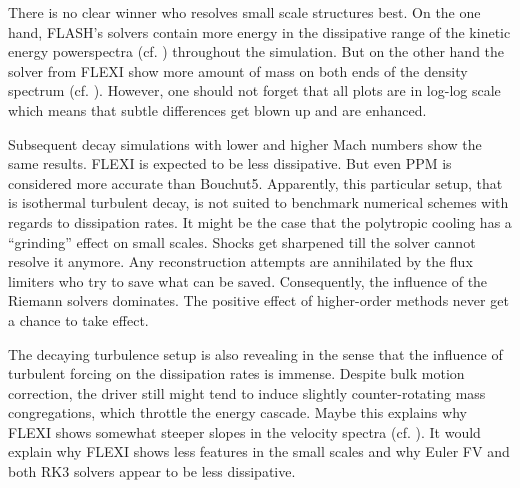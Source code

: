 There is no clear winner who resolves small scale structures best.  On the
one hand, FLASH's solvers contain more energy in the dissipative range of the kinetic
energy powerspectra (cf. ) throughout
the simulation. But on the other hand the solver from FLEXI show more amount of
mass on both ends of the density spectrum (cf.
). However, one should not forget that
all plots are in log-log scale which means that subtle differences get blown
up and are enhanced.

Subsequent decay simulations with lower and higher Mach numbers show the same
results. FLEXI is expected to be less dissipative. But even PPM is considered
more accurate than Bouchut5. Apparently, this particular setup, that is
isothermal turbulent decay, is not suited to benchmark numerical schemes with
regards to dissipation rates. It might be the case that the polytropic cooling
has a ``grinding'' effect on small scales. Shocks get sharpened till the solver
cannot resolve it anymore. Any reconstruction attempts are annihilated by the
flux limiters who try to save what can be saved. Consequently, the influence of
the Riemann solvers dominates. The positive effect of higher-order methods never
get a chance to take effect.

The decaying turbulence setup is also revealing in the sense that the influence
of turbulent forcing on the dissipation rates is immense. Despite bulk motion
correction, the driver still might tend to induce slightly counter-rotating
mass congregations, which throttle the energy cascade. Maybe this explains why
FLEXI shows somewhat steeper slopes in the velocity spectra (cf.
). It would explain why FLEXI shows less features in the
small scales and why Euler FV and both RK3 solvers appear to be less
dissipative.
